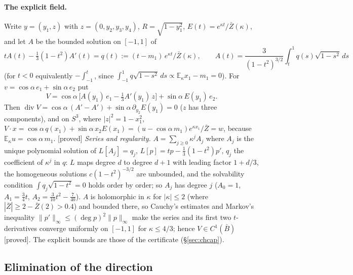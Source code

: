 \documentclass[11pt,a4paper]{article}
\theoremstyle{remark}
\theoremstyle{definition}
\newcommand{\E}{\mathbb{E}}
\newcommand{\st}[1]{\textsf{[#1]}}
\newcommand{\Zb}{\bar Z}
\begin{document}
\paragraph{The explicit field.} Write $y=(y_1,z)$ with $z=(0,y_2,y_3,y_4)$, $R=\sqrt{1-y_1^2}$,
$E(t)=e^{\kappa t}/\Zb(\kappa)$, and let $A$ be the bounded solution on $[-1,1]$ of
\begin{equation}\label{eq:ode}
tA(t)-\tfrac13(1-t^2)A'(t)=q(t):=(t-m_1)\,e^{\kappa t}/\Zb(\kappa),\qquad
A(t)=\frac{3}{(1-t^2)^{3/2}}\int_t^1q(s)\sqrt{1-s^2}\,ds
\end{equation}
(for $t<0$ equivalently $-\int_{-1}^t$, since $\int_{-1}^1q\sqrt{1-s^2}\,ds\propto\E_\kappa x_1-m_1=0$). For
$v=\cos\alpha\,e_1+\sin\alpha\,e_2$ put
\begin{equation}\label{eq:field}
V=\cos\alpha\,\big[A(y_1)\,e_1-\tfrac13A'(y_1)\,z\big]+\sin\alpha\,E(y_1)\,e_2 .
\end{equation}
Then $\operatorname{div}V=\cos\alpha\,(A'-A')+\sin\alpha\,\partial_{y_2}E(y_1)=0$ ($z$ has three components), and on
$S^3$, where $|z|^2=1-x_1^2$, $V\cdot x=\cos\alpha\,q(x_1)+\sin\alpha\,x_2E(x_1)=(u-\cos\alpha\,m_1)e^{\kappa x_1}/\Zb=w$,
because $\E_\kappa u=\cos\alpha\,m_1$. \st{proved}
\emph{Series and regularity.} $A=\sum_{j\ge0}\kappa^jA_j$ where $A_j$ is the unique polynomial solution of
$L[A_j]=q_j$, $L[p]=tp-\frac13(1-t^2)p'$, $q_j$ the coefficient of $\kappa^j$ in $q$: $L$ maps degree $d$ to
degree $d+1$ with leading factor $1+d/3$, the homogeneous solutions $c(1-t^2)^{-3/2}$ are unbounded, and the
solvability condition $\int q_j\sqrt{1-t^2}=0$ holds order by order; so $A_j$ has degree $j$
($A_0=1$, $A_1=\frac34t$, $A_2=\frac3{10}t^2-\frac7{40}$). $A$ is holomorphic in $\kappa$ for $|\kappa|\le2$ (where
$|\Zb|\ge2-\Zb(2)>0.4$) and bounded there, so Cauchy's estimates and Markov's inequality $\|p'\|_\infty\le
(\deg p)^2\|p\|_\infty$ make the series and its first two $t$-derivatives converge uniformly on $[-1,1]$ for
$\kappa\le4/3$; hence $V\in C^1(\bar B)$ \st{proved}. The explicit bounds are those of the certificate
(\S\ref{sec:chcap}).

\subsection{Elimination of the direction}\label{sec:chalpha}
\end{document}
